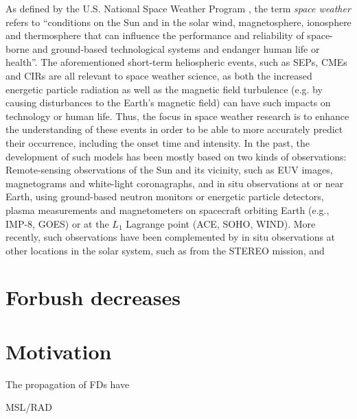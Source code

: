 As defined by the U.S. National Space Weather Program \parencite{OFCM-1995}, the term \textit{space weather} refers to ``conditions on the Sun and in the solar wind, magnetosphere, ionosphere and thermosphere that can influence the performance and reliability of space-borne and ground-based technological systems and endanger human life or health''.
The aforementioned short-term heliospheric events, such as \acp{SEP}, \acp{CME} and \acp{CIR} are all relevant to space weather science, as both the increased energetic particle radiation as well as the magnetic field turbulence (e.g. by causing disturbances to the Earth's magnetic field) can have such impacts on technology or human life.
Thus, the focus in space weather research is to enhance the understanding of these events in order to be able to more accurately predict their occurrence, including the onset time and intensity.
In the past, the development of such models has been mostly based on two kinds of observations: Remote-sensing observations of the Sun and its vicinity, such as EUV images, magnetograms and white-light coronagraphs, and in situ observations at or near Earth, using ground-based neutron monitors or energetic particle detectors, plasma measurements and magnetometers on spacecraft orbiting Earth (e.g., IMP-8, GOES) or at the $L_1$ Lagrange point (ACE, SOHO, WIND).
More recently, such observations have been complemented by in situ observations at other locations in the solar system, such as from the STEREO mission, and 


\section{Forbush decreases}

\section{Motivation}

The propagation of 
\acp{FD} have 

\ac{MSL}/\ac{RAD}